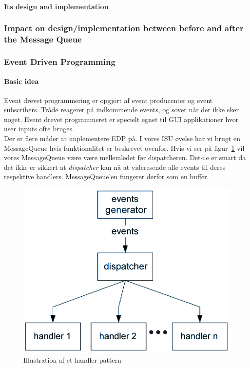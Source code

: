 \paragraph{Its design and implementation}

\subsubsection{Impact on design/implementation between before and after the Message Queue}

\subsubsection{Event Driven Programming}

\paragraph{Basic idea}
Event drevet programmering er opgjort af event producenter og event subscribers.
Tråde reagerer på indkommende events, og sover når der ikke sker noget.
Event drevet programmeret er specielt egnet til GUI applikationer hvor user inputs ofte bruges. \\

Der er flere måder at implementere EDP på. I vores ISU øvelse har vi brugt en MessageQueue hvis funktionalitet er beskrevet ovenfor.
Hvis vi ser på figur~\ref{fig:handlPat} vil vores MessageQueue være være mellemledet før dispatcheren. Det<e er smart da det ikke er sikkert at \textit{dispatcher} kan nå at videresende alle events til deres respektive handlers. MessageQueue'en fungerer derfor som en buffer.

\begin{figure}[h]
	\centering
	\includegraphics[width=0.6\linewidth]{figs/spm3/handlersPattern}
	\caption{Illustration af et handler pattern}
	\label{fig:handlPat}
\end{figure}

